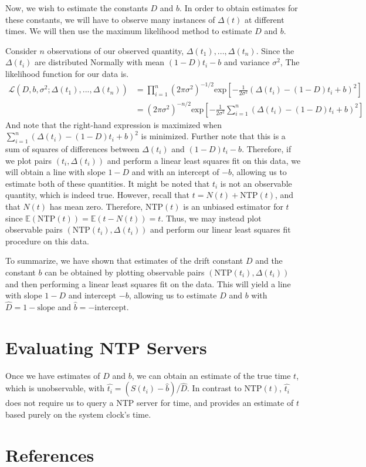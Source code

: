 \documentclass[letterpaper, 11pt]{article}
\begin{document}
Now, we wish to estimate the constants $D$ and $b$. In order to obtain estimates for these
constants, we will have to observe many instances of $\Delta(t)$ at different times. We will
then use the maximum likelihood method to estimate $D$ and $b$.

Consider $n$ observations of our observed quantity, $\Delta(t_1), ..., \Delta(t_n)$.
Since the $\Delta(t_i)$ are distributed Normally with mean $(1-D)t_i - b$
and variance $\sigma^2$,
The likelihood function for our data is.
\begin{align}
    \mathcal{L}(D, b, \sigma^2; \Delta(t_1),..., \Delta(t_n)) &= \prod_{i=1}^n
    (2\pi \sigma^2)^{-1/2} \text{exp}[- \frac{1}{2\sigma^2} (\Delta(t_i)
    - (1-D)t_i +b)^2] \\
    &=  (2\pi \sigma^2)^{-n/2} \text{exp}[- \frac{1}{2\sigma^2} \sum_{i=1}^n 
    (\Delta(t_i) - (1-D)t_i + b)^2 ]
\end{align}
And note that the right-hand expression is maximized when
$\sum_{i=1}^n 
(\Delta(t_i) - (1-D)t_i + b)^2$
is minimized. Further note that this is a sum of squares of differences between
$\Delta(t_i)$ and $(1-D)t_i - b$. Therefore, if we plot pairs $(t_i, \Delta(t_i))$ and
perform a linear least squares fit on this data, we will obtain a line with slope $1-D$ and 
with an intercept of $-b$, allowing us to estimate both of these quantities. It might be noted that $t_i$ is not an observable quantity, which
is indeed true. However, recall that $t = N(t) + \text{NTP}(t)$, and that $N(t)$ has mean zero.
Therefore, $\text{NTP}(t)$ is an unbiased estimator for $t$ since
$\mathbb{E}(\text{NTP}(t)) = \mathbb{E}(t - N(t)) = t$. Thus, we may instead plot observable
pairs $(\text{NTP}(t_i), \Delta(t_i))$ and perform our linear least squares fit procedure on this
data.

To summarize, we have shown that estimates of the drift constant $D$ and the constant $b$
can be obtained by plotting observable pairs $(\text{NTP}(t_i), \Delta(t_i))$ and then
performing a linear least squares fit on the data. This will yield a line with slope $1-D$ and
intercept $-b$, allowing us to estimate $D$ and $b$ with $\hat{D} = 1 - \text{slope}$ and
$\hat{b} = - \text{intercept}$.



\section{Evaluating NTP Servers}
Once we have estimates of $D$ and $b$, we can obtain an estimate of the true time $t$, which is
unobservable, with $\hat{t_i} = (S(t_i) -\hat{b}) / {\hat{D}}$. In contrast to $\text{NTP}(t)$,
$\hat{t_i}$ does not require us to query a NTP server for time, and provides an estimate of $t$
based purely on the system clock's time.


\pagebreak

\section{References}



\end{document}
